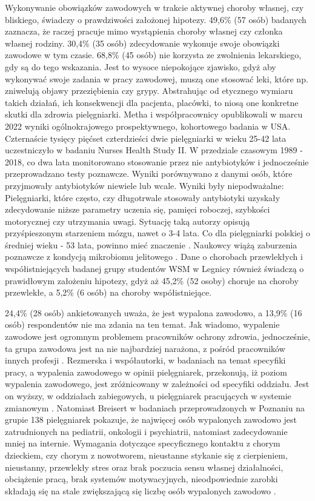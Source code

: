 \documentclass[a4paper,12pt,twoside,openright]{mwrep}
\begin{document}
Wykonywanie obowiązków zawodowych w trakcie aktywnej choroby własnej, czy bliskiego, świadczy o prawdziwości założonej hipotezy. 49,6\% (57 osób) badanych zaznacza, że raczej pracuje mimo wystąpienia choroby własnej czy członka własnej rodziny. 30,4\% (35 osób) zdecydowanie wykonuje swoje obowiązki zawodowe w tym czasie. 68,8\% (45 osób) nie korzysta ze zwolnienia lekarskiego, gdy są do tego wskazania. Jest to wysoce niepokojące zjawisko, gdyż aby wykonywać swoje zadania w pracy zawodowej, muszą one stosować leki, które np. zniwelują objawy przeziębienia czy grypy. Abstrahując od etycznego wymiaru takich działań,  ich konsekwencji dla pacjenta, placówki, to niosą one konkretne skutki dla zdrowia pielęgniarki. Metha i współpracownicy opublikowali w marcu 2022 wyniki ogólnokrajowego prospektywnego, kohortowego badania  w USA. Czternaście tysięcy pięćset czterdzieści dwie  pielęgniarki w wieku 25-42 lata uczestniczyło w badaniu Nurses Health Study II. W przedziale czasowym 1989 - 2018,  co dwa lata monitorowano stosowanie przez nie antybiotyków i jednocześnie przeprowadzano testy poznawcze. Wyniki porównywano z danymi osób, które przyjmowały antybiotyków niewiele lub wcale. Wyniki były niepodważalne: Pielęgniarki, które często, czy długotrwale stosowały antybiotyki uzyskały zdecydowanie niższe parametry uczenia się, pamięci roboczej, szybkości motorycznej czy utrzymania uwagi. Sytuację taką autorzy opisują przyśpieszonym starzeniem mózgu, nawet o 3-4 lata.  Co dla  pielęgniarki polskiej o średniej wieku - 53 lata, powinno mieć znaczenie \cite{statystyka}.  Naukowcy  wiążą zaburzenia poznawcze z  kondycją mikrobiomu jelitowego \cite{metha}.
Dane o chorobach przewlekłych i współistniejących badanej grupy  studentów WSM w Legnicy  również  świadczą o prawidłowym założeniu hipotezy, gdyż aż 45,2\% (52 osoby) choruje na choroby przewlekłe, a 5,2\% (6 osób) na choroby współistniejące.


24,4\% (28 osób) ankietowanych uważa, że jest wypalona zawodowo, a 13,9\% (16 osób) respondentów nie ma zdania na ten temat. Jak wiadomo, wypalenie zawodowe jest ogromnym problemem pracowników ochrony zdrowia, jednocześnie, ta grupa zawodowa jest na nie najbardziej narażona,  z pośród pracowników innych profesji \cite{wypal}. Rezmerska i współautorki, w badaniach na temat specyfiki pracy, a wypalenia zawodowego w opinii pielęgniarek,  przekonują, iż poziom wypalenia zawodowego, jest zróżnicowany w zależności od specyfiki oddziału. Jest on wyższy, w oddziałach zabiegowych, u pielęgniarek pracujących w systemie zmianowym \cite{zmiany}. Natomiast Breisert w badaniach przeprowadzonych w Poznaniu na grupie 138 pielęgniarek pokazuje, że najwięcej osób wypalonych zawodowo jest zatrudnionych na pediatrii, onkologii i psychiatrii, natomiast zadecydowanie mniej na internie. Wymagania dotyczące specyficznego kontaktu z chorym dzieckiem, czy chorym z nowotworem, nieustanne stykanie się z cierpieniem, nieustanny, przewlekły stres oraz brak poczucia sensu własnej działalności, obciążenie pracą, brak systemów motywacyjnych, nieodpowiednie zarobki składają się na stale zwiększającą się liczbę osób wypalonych zawodowo \cite{breisert}.
\end{document}
